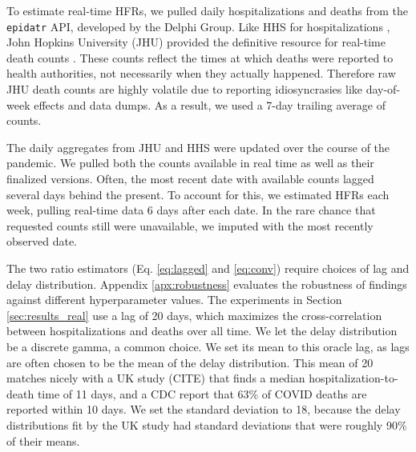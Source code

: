 \documentclass{article}
\begin{document}

To estimate real-time HFRs, we pulled daily hospitalizations and deaths from the \texttt{epidatr} API, developed by the Delphi Group. Like HHS for hospitalizations \citep{HHS2023}, John Hopkins University (JHU) provided the definitive resource for real-time death counts \citep{JHUepidatr}. These counts reflect the times at which deaths were reported to health authorities, not necessarily when they actually happened. Therefore raw JHU death counts are highly volatile due to reporting idiosyncrasies like day-of-week effects and data dumps. As a result, we used a 7-day trailing average of counts. 

The daily aggregates from JHU and HHS were updated over the course of the pandemic. We pulled both the counts available in real time as well as their finalized versions. Often, the most recent date with available counts lagged several days behind the present. To account for this, we estimated HFRs each week, pulling real-time data 6 days after each date. In the rare chance that requested counts still were unavailable, we imputed with the most recently observed date.


The two ratio estimators (Eq. \ref{eq:lagged} and \ref{eq:conv}) require choices of lag and delay distribution. Appendix \ref{apx:robustness} evaluates the robustness of findings against different hyperparameter values. The experiments in Section \ref{sec:results_real} use a lag of 20 days, which maximizes the cross-correlation between hospitalizations and deaths over all time. We let the delay distribution be a discrete gamma, a common choice. We set its mean to this oracle lag, as lags are often chosen to be the mean of the delay distribution. This mean of 20 matches nicely with a UK study (CITE) that finds a median hospitalization-to-death time of 11 days, and a CDC report that 63\% of COVID deaths are reported within 10 days. We set the standard deviation to 18, because the delay distributions fit by the UK study had standard deviations that were roughly 90\% of their means. 
\end{document}
